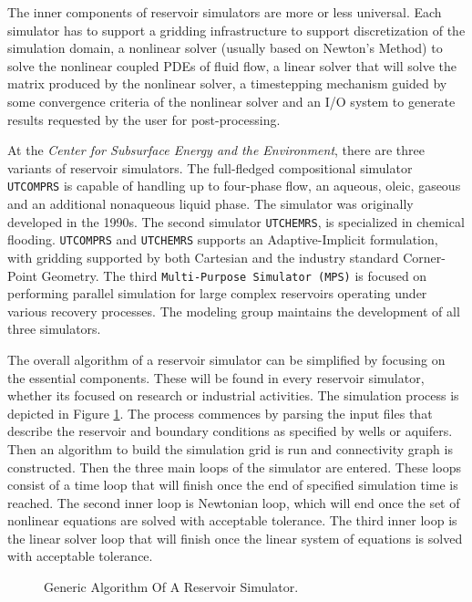The inner components of reservoir simulators are more or less universal. Each simulator has to support a 
gridding infrastructure to support discretization of the simulation domain, a nonlinear solver (usually based on Newton's Method) to 
solve the nonlinear coupled PDEs of fluid flow, a linear solver that will solve the matrix produced by the nonlinear solver, a timestepping
mechanism guided by some convergence criteria of the nonlinear solver and an I/O system to generate results requested by the user for post-processing.

At the \textit{Center for Subsurface Energy and the Environment}, there are three variants of reservoir simulators. The full-fledged compositional 
simulator \texttt{UTCOMPRS} is capable of handling up to four-phase flow, an aqueous, oleic, gaseous and an additional nonaqueous liquid phase. 
The simulator was originally developed in the 1990s\supercite{utcomp}. The second simulator \texttt{UTCHEMRS}, is specialized in chemical flooding.
\texttt{UTCOMPRS} and \texttt{UTCHEMRS} supports an Adaptive-Implicit formulation, with gridding supported by both Cartesian and the industry standard
Corner-Point Geometry. The third \texttt{Multi-Purpose Simulator (MPS)} is focused on performing parallel simulation for large complex reservoirs operating under
various recovery processes. The modeling group maintains the development of all three simulators. 

The overall algorithm of a reservoir simulator can be simplified by focusing on the essential components. These will be found in every reservoir simulator, whether
its focused on research or industrial activities. The simulation process is depicted in Figure \ref{simulator}. The process commences by parsing the input files that describe the
reservoir and boundary conditions as specified by wells or aquifers. Then an algorithm to build the simulation grid is run and connectivity graph is constructed. Then the three main
loops of the simulator are entered. These loops consist of a time loop that will finish once the end of specified simulation time is reached. The second inner loop is Newtonian loop,
which will end once the set of nonlinear equations are solved with acceptable tolerance. The third inner loop is the linear solver loop that will finish once the linear system of equations
is solved with acceptable tolerance.

\begin{figure}[htb]
\raggedright
\resizebox{15cm}{!}{}
\caption{Generic Algorithm Of A Reservoir Simulator.}\label{simulator}
\end{figure}
\clearpage

